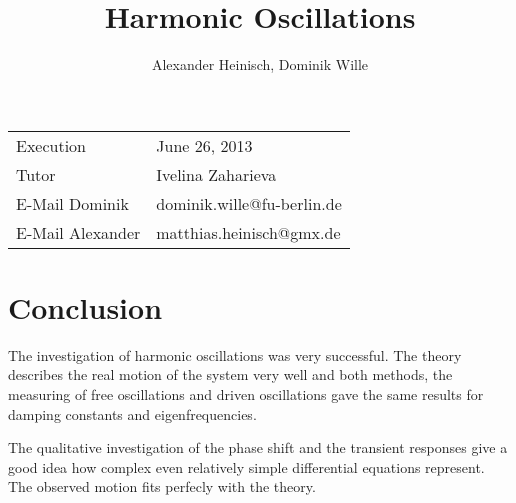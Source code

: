 
 
\title{Harmonic Oscillations}
\author{Alexander Heinisch, Dominik Wille}

\maketitle
\vspace{12cm}
\noindent
\begin{tabular}{l l} 
Execution & June 26, 2013 \\
Tutor & Ivelina Zaharieva  \\
E-Mail Dominik & dominik.wille@fu-berlin.de \\
E-Mail Alexander & matthias.heinisch@gmx.de \\
 \end{tabular}

\newpage
\tableofcontents
\newpage







\newpage
\section{Conclusion}
The investigation of harmonic oscillations was very successful. The theory describes
the real motion of the system very well and both methods, the measuring of free oscillations
and driven oscillations gave the same results for damping constants and eigenfrequencies.


The qualitative investigation of the phase shift and the transient responses give
a good idea how complex even relatively simple differential equations represent. The
observed motion fits perfecly with the theory.



